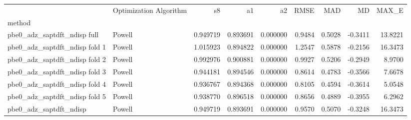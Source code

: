 \begin{tabular}{llrrrrrrr}
 & Optimization Algorithm & s8 & a1 & a2 & RMSE & MAD & MD & MAX_E \\
method &  &  &  &  &  &  &  &  \\
pbe0_adz_saptdft_ndisp full & Powell & 0.949719 & 0.893691 & 0.000000 & 0.9484 & 0.5028 & -0.3411 & 13.8221 \\
pbe0_adz_saptdft_ndisp fold 1 & Powell & 1.015923 & 0.894822 & 0.000000 & 1.2547 & 0.5878 & -0.2156 & 16.3473 \\
pbe0_adz_saptdft_ndisp fold 2 & Powell & 0.992976 & 0.900881 & 0.000000 & 0.9927 & 0.5206 & -0.2949 & 8.9700 \\
pbe0_adz_saptdft_ndisp fold 3 & Powell & 0.944181 & 0.894546 & 0.000000 & 0.8614 & 0.4783 & -0.3566 & 7.6678 \\
pbe0_adz_saptdft_ndisp fold 4 & Powell & 0.936767 & 0.894368 & 0.000000 & 0.8105 & 0.4594 & -0.3614 & 5.0548 \\
pbe0_adz_saptdft_ndisp fold 5 & Powell & 0.938770 & 0.896518 & 0.000000 & 0.8656 & 0.4889 & -0.3955 & 6.2962 \\
pbe0_adz_saptdft_ndisp & Powell & 0.949719 & 0.893691 & 0.000000 & 0.9570 & 0.5070 & -0.3248 & 16.3473 \\
\end{tabular}
